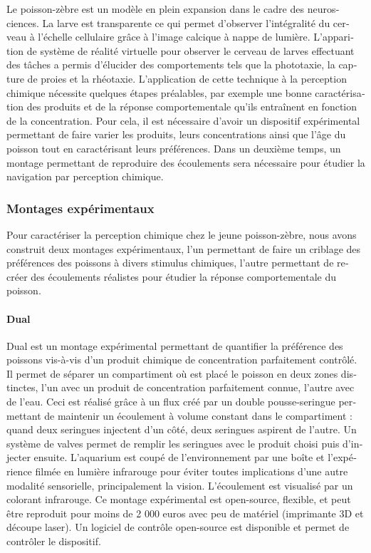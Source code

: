 \begin{otherlanguage}{french}
Le poisson-zèbre est un modèle en plein expansion dans le cadre des neurosciences. La larve est transparente ce qui permet d'observer l'intégralité du cerveau à l'échelle cellulaire grâce à l'image calcique à nappe de lumière. L'apparition de système de réalité virtuelle pour observer le cerveau de larves effectuant des tâches a permis d'élucider des comportements tels que la phototaxie, la capture de proies et la rhéotaxie. L'application de cette technique à la perception chimique nécessite quelques étapes préalables, par exemple une bonne caractérisation des produits et de la réponse comportementale qu'ils entraînent en fonction de la concentration. Pour cela, il est nécessaire d'avoir un dispositif expérimental permettant de faire varier les produits, leurs concentrations ainsi que l'âge du poisson tout en caractérisant leurs préférences. Dans un deuxième temps, un montage permettant de reproduire des écoulements sera nécessaire pour étudier la navigation par perception chimique.

\subsubsection*{Montages expérimentaux}
Pour caractériser la perception chimique chez le jeune poisson-zèbre, nous avons construit deux montages expérimentaux, l'un permettant de faire un criblage des préférences des poissons à divers stimulus chimiques, l'autre permettant de recréer des écoulements réalistes pour étudier la réponse comportementale du poisson.

\paragraph{Dual} Dual est un montage expérimental permettant de quantifier la préférence des poissons vis-à-vis d'un produit chimique de concentration parfaitement contrôlé. Il permet de séparer un compartiment où est placé le poisson en deux zones distinctes, l'un avec un produit de concentration parfaitement connue, l'autre avec de l'eau. Ceci est réalisé grâce à un flux créé par un double pousse-seringue permettant de maintenir un écoulement à volume constant dans le compartiment : quand deux seringues injectent d'un côté, deux seringues aspirent de l'autre. Un système de valves permet de remplir les seringues avec le produit choisi puis d'injecter ensuite. L'aquarium est coupé de l'environnement par une boîte et l'expérience filmée en lumière infrarouge pour éviter toutes implications d'une autre modalité sensorielle, principalement la vision. L'écoulement est visualisé par un colorant infrarouge. Ce montage expérimental est open-source, flexible, et peut être reproduit pour moins de 2 000 euros avec peu de matériel (imprimante 3D et découpe laser). Un logiciel de contrôle open-source est disponible et permet de contrôler le dispositif.


\end{otherlanguage}

